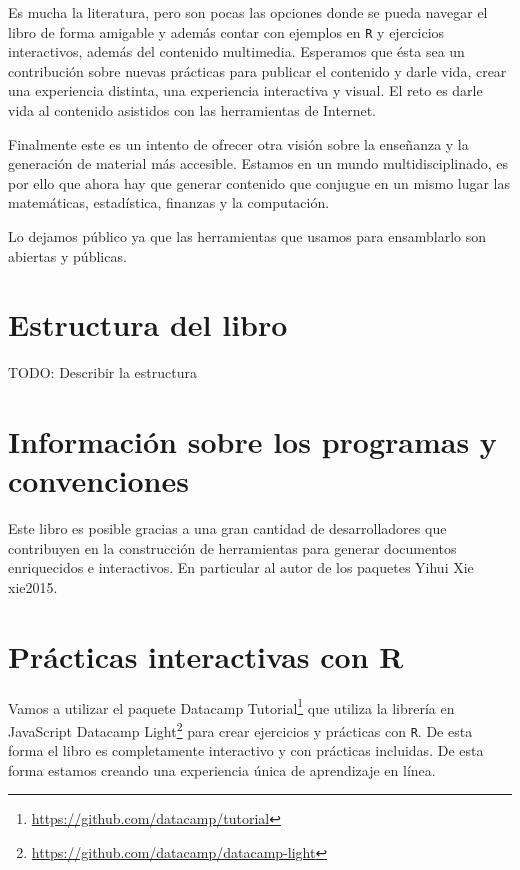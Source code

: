 \documentclass[
  12pt,
]{krantz}
\renewcommand{\href}[2]{#2\footnote{\url{#1}}}
\begin{document}
Es mucha la literatura, pero son pocas las opciones donde se pueda navegar el libro de forma amigable y además contar con ejemplos en \texttt{R} y ejercicios interactivos, además del contenido multimedia. Esperamos que ésta sea un contribución sobre nuevas prácticas para publicar el contenido y darle vida, crear una experiencia distinta, una experiencia interactiva y visual. El reto es darle vida al contenido asistidos con las herramientas de Internet.

Finalmente este es un intento de ofrecer otra visión sobre la enseñanza y la generación de material más accesible. Estamos en un mundo multidisciplinado, es por ello que ahora hay que generar contenido que conjugue en un mismo lugar las matemáticas, estadística, finanzas y la computación.

Lo dejamos público ya que las herramientas que usamos para ensamblarlo son abiertas y públicas.

\hypertarget{estructura-del-libro}{%
\section*{Estructura del libro}\label{estructura-del-libro}}


TODO: Describir la estructura

\hypertarget{informacion-sobre-los-programas-y-convenciones}{%
\section*{Información sobre los programas y convenciones}\label{informacion-sobre-los-programas-y-convenciones}}


Este libro es posible gracias a una gran cantidad de desarrolladores que contribuyen en la construcción de herramientas para generar documentos enriquecidos e interactivos. En particular al autor de los paquetes Yihui Xie xie2015.

\hypertarget{practicas-interactivas-con-r}{%
\section*{Prácticas interactivas con R}\label{practicas-interactivas-con-r}}


Vamos a utilizar el paquete \href{https://github.com/datacamp/tutorial}{Datacamp Tutorial} que utiliza la librería en JavaScript \href{https://github.com/datacamp/datacamp-light}{Datacamp Light} para crear ejercicios y prácticas con \texttt{R}. De esta forma el libro es completamente interactivo y con prácticas incluidas. De esta forma estamos creando una experiencia única de aprendizaje en línea.
\end{document}
